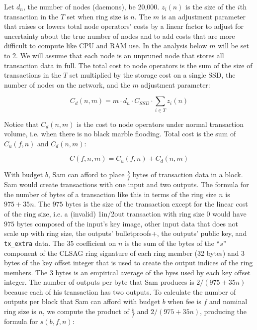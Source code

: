 \documentclass[english]{article}
\begin{document}
Let $d_{n}$, the number of nodes (daemons), be 20,000. $z_{i}\left(n\right)$
is the size of the $i$th transaction in the $T$ set when ring size
is $n$. The $m$ is an adjustment parameter that raises or lowers
total node operators' costs by a linear factor to adjust for uncertainty
about the true number of nodes and to add costs that are more difficult
to compute like CPU and RAM use. In the analysis below $m$ will be
set to 2. We will assume that each node is an unpruned node that stores
all transaction data in full. The total cost to node operators is
the sum of the size of transactions in the $T$ set multiplied by
the storage cost on a single SSD, the number of nodes on the network,
and the $m$ adjustment parameter:

\begin{equation}
C_{d}\left(n,m\right)=m\cdot d_{n}\cdot C_{SSD}\cdot\underset{i\in T}{\sum}z_{i}\left(n\right)
\end{equation}

Notice that $C_{d}\left(n,m\right)$ is the cost to node operators
under normal transaction volume, i.e. when there is no black marble
flooding. Total cost is the sum of $C_{u}\left(f,n\right)$ and $C_{d}\left(n,m\right)$:

\begin{equation}
C\left(f,n,m\right)=C_{u}\left(f,n\right)+C_{d}\left(n,m\right)
\end{equation}

With budget $b$, Sam can afford to place $\frac{b}{f}$ bytes of
transaction data in a block. Sam would create transactions with one
input and two outputs. The formula for the number of bytes of a transaction
like this in terms of the ring size $n$ is $975+35n$. The $975$
bytes is the size of the transaction except for the linear cost of
the ring size, i.e. a (invalid) 1in/2out transaction with ring size
0 would have $975$ bytes composed of the input's key image, other
input data that does not scale up with ring size, the outputs' bulletproofs+,
the outputs' public key, and \texttt{tx\_extra} data. The $35$ coefficient
on $n$ is the sum of the bytes of the ``$s$'' component of the
CLSAG ring signature of each ring member (32 bytes) and $3$ bytes
of the key offset integer that is used to create the output indices
of the ring members. The $3$ bytes is an empirical average of the
byes used by each key offset integer. The number of outputs per byte
that Sam produces is $2/\left(975+35n\right)$ because each of his
transaction has two outputs. To calculate the number of outputs per
block that Sam can afford with budget $b$ when fee is $f$ and nominal
ring size is $n$, we compute the product of $\frac{b}{f}$ and $2/\left(975+35n\right)$,
producing the formula for $s\left(b,f,n\right)$:
\end{document}
